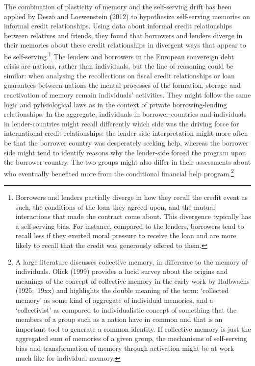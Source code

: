 The combination of plasticity of memory and the self-serving drift has been
applied by Desz\"{o} and Loewenstein (2012) to hypothesize self-serving
memories on informal credit relationships. Using data about informal credit
relationships between relatives and friends, they found that borrowers and
lenders diverge in their memories about these credit relationships in
divergent ways that appear to be self-serving.\footnote{%
Borrowers and lenders partially diverge in how they recall the credit event
as such, the conditions of the loan they agreed upon, and the mutual
interactions that made the contract come about. This divergence typically
has a self-serving bias. For instance, compared to the lenders, borrowers
tend to recall less if they exerted moral pressure to receive the loan and
are more likely to recall that the credit was generously offered to them.}
The lenders and borrowers in the European souvereign debt crisis are
nations, rather than individuals, but the line of reasoning could be
similar: when analysing the recollections on fiscal credit relationships or
loan guarantees between nations the mental processes of the formation,
storage and reactivation of memory remain individuals' activities. They
might follow the same logic and pyhsiological laws as in the context of
private borrowing-lending relationships. In the aggregate, individuals in
borrower-countries and individuals in lender-countries might recall
differently which side was the driving force for international credit
relationships: the lender-side interpretation might more often be that the
borrower country was desperately seeking help, whereas the borrower side
might tend to identify reasons why the lender-side forced the program upon
the borrower country. The two groups might also differ in their assessments
about who eventually benefited more from the conditional financial help
program.\footnote{%
A large literature discusses collective memory, in difference to the memory
of individuals. Olick (1999) provides a lucid survey about the origins and
meanings of the concept of collective memory in the early work by Halbwachs
(1925;\ 19xx) and highlights the double meaning of the term: `collected
memory' as some kind of aggregate of individual memories, and a
`collectivist' as compared to individualistic concept of something that the
members of a group such as a nation have in common and that is an important
tool to generate a common identity. If collective memory is just the
aggregated sum of memories of a given group, the mechanisms of self-serving
bias and transformation of memory through activation might be at work much
like for individual memory.}

